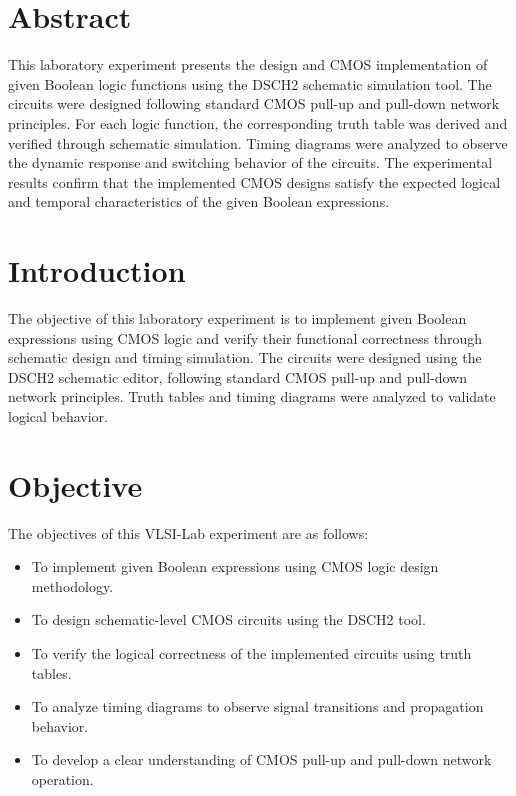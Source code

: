 \documentclass[12pt]{article}
\begin{document}
\tableofcontents
\thispagestyle{empty}
\clearpage
{}

\section*{\center Abstract}
This laboratory experiment presents the design and CMOS implementation of given Boolean logic functions using the DSCH2 schematic simulation tool. The circuits were designed following standard CMOS pull-up and pull-down network principles. For each logic function, the corresponding truth table was derived and verified through schematic simulation. Timing diagrams were analyzed to observe the dynamic response and switching behavior of the circuits. The experimental results confirm that the implemented CMOS designs satisfy the expected logical and temporal characteristics of the given Boolean expressions.


\section{Introduction}
The objective of this laboratory experiment is to implement given Boolean expressions using CMOS logic and verify their functional correctness through schematic design and timing simulation. The circuits were designed using the DSCH2 schematic editor, following standard CMOS pull-up and pull-down network principles. Truth tables and timing diagrams were analyzed to validate logical behavior.


\section{Objective}
The objectives of this VLSI-Lab experiment are as follows:
\begin{itemize}
    \item To implement given Boolean expressions using CMOS logic design methodology.
    \item To design schematic-level CMOS circuits using the DSCH2 tool.
    \item To verify the logical correctness of the implemented circuits using truth tables.
    \item To analyze timing diagrams to observe signal transitions and propagation behavior.
    \item To develop a clear understanding of CMOS pull-up and pull-down network operation.
\end{itemize}
\end{document}

